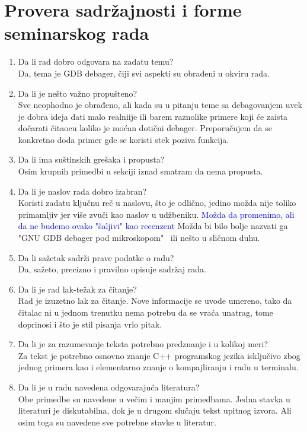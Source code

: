 \documentclass[a4paper]{report}
\newcommand{\odgovor}[1]{\textcolor{blue}{#1}}
\begin{document}
\section{Provera sadržajnosti i forme seminarskog rada}

\begin{enumerate}
\item Da li rad dobro odgovara na zadatu temu?\\
Da, tema je GDB debager, čiji svi aspekti su obrađeni u okviru rada.
\item Da li je nešto važno propušteno?\\
Sve neophodno je obrađeno, ali kada su u pitanju teme sa debagovanjem uvek je dobra ideja dati malo realniije ili barem raznolike primere koji će zaista dočarati čitaocu koliko je moćan dotični debager. Preporučujem da se konkretno doda primer gde se koristi stek poziva funkcija.
\item Da li ima suštinskih grešaka i propusta?\\
Osim krupnih primedbi u sekciji iznad smatram da nema propusta.
\item Da li je naslov rada dobro izabran?\\
Koristi zadatu ključnu reč u naslovu, što je odlično, jedino možda nije toliko primamljiv jer više zvuči kao naslov u udžbeniku.
	\odgovor{Možda da promenimo, ali da ne budemo ovako "šaljivi"{} kao recenzent} 
Možda bi bilo bolje nazvati ga "GNU GDB debager pod mikroskopom" \ ili nešto u sličnom duhu. 
\item Da li sažetak sadrži prave podatke o radu?\\
Da, sažeto, precizno i pravilno opisuje sadržaj rada.
\item Da li je rad lak-težak za čitanje?\\
Rad je izuzetno lak za čitanje. Nove informacije se uvode umereno, tako da čitalac ni u jednom trenutku nema potrebu da se vraća unatrag, tome doprinosi i što je stil pisanja vrlo pitak.
\item Da li je za razumevanje teksta potrebno predznanje i u kolikoj meri?\\
Za tekst je potrebno osnovno znanje C++ programskog jezika isključivo zbog jednog primera kao i elementarno znanje o kompajliranju i radu u terminalu.
\item Da li je u radu navedena odgovarajuća literatura?\\
Obe primedbe su navedene u večim i manjim primedbama. Jedna stavka u literaturi je diskutabilna, dok je u drugom slučaju tekst upitnog izvora. Ali osim toga su navedene sve potrebne stavke u literatur.

\end{enumerate}
\end{document}
